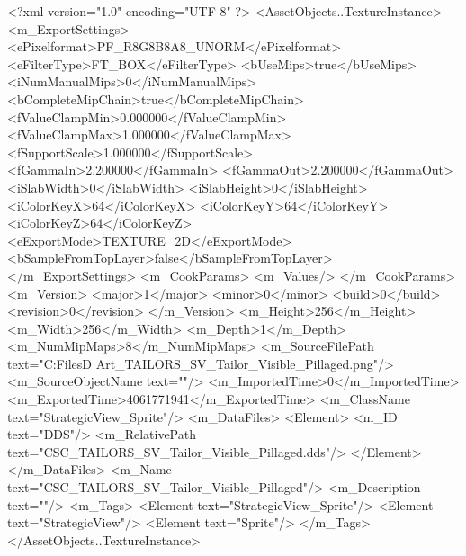 <?xml version="1.0" encoding="UTF-8" ?>
<AssetObjects..TextureInstance>
	<m_ExportSettings>
		<ePixelformat>PF_R8G8B8A8_UNORM</ePixelformat>
		<eFilterType>FT_BOX</eFilterType>
		<bUseMips>true</bUseMips>
		<iNumManualMips>0</iNumManualMips>
		<bCompleteMipChain>true</bCompleteMipChain>
		<fValueClampMin>0.000000</fValueClampMin>
		<fValueClampMax>1.000000</fValueClampMax>
		<fSupportScale>1.000000</fSupportScale>
		<fGammaIn>2.200000</fGammaIn>
		<fGammaOut>2.200000</fGammaOut>
		<iSlabWidth>0</iSlabWidth>
		<iSlabHeight>0</iSlabHeight>
		<iColorKeyX>64</iColorKeyX>
		<iColorKeyY>64</iColorKeyY>
		<iColorKeyZ>64</iColorKeyZ>
		<eExportMode>TEXTURE_2D</eExportMode>
		<bSampleFromTopLayer>false</bSampleFromTopLayer>
	</m_ExportSettings>
	<m_CookParams>
		<m_Values/>
	</m_CookParams>
	<m_Version>
		<major>1</major>
		<minor>0</minor>
		<build>0</build>
		<revision>0</revision>
	</m_Version>
	<m_Height>256</m_Height>
	<m_Width>256</m_Width>
	<m_Depth>1</m_Depth>
	<m_NumMipMaps>8</m_NumMipMaps>
	<m_SourceFilePath text="C:\Users\Shadow\Desktop\Working Files\2D Art\Quarters\Tailors\StrategicView\CSC_TAILORS_SV_Tailor_Visible_Pillaged.png"/>
	<m_SourceObjectName text=""/>
	<m_ImportedTime>0</m_ImportedTime>
	<m_ExportedTime>4061771941</m_ExportedTime>
	<m_ClassName text="StrategicView_Sprite"/>
	<m_DataFiles>
		<Element>
			<m_ID text="DDS"/>
			<m_RelativePath text="CSC_TAILORS_SV_Tailor_Visible_Pillaged.dds"/>
		</Element>
	</m_DataFiles>
	<m_Name text="CSC_TAILORS_SV_Tailor_Visible_Pillaged"/>
	<m_Description text=""/>
	<m_Tags>
		<Element text="StrategicView_Sprite"/>
		<Element text="StrategicView"/>
		<Element text="Sprite"/>
	</m_Tags>
</AssetObjects..TextureInstance>

